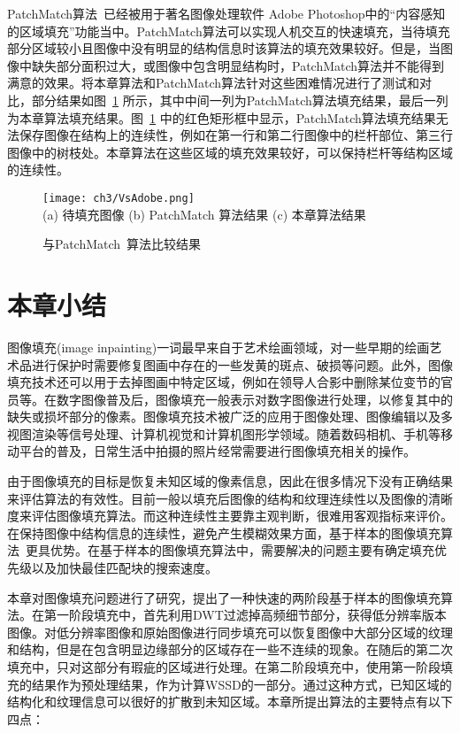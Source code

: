 PatchMatch算法~\cite{Barnes:2009}已经被用于著名图像处理软件 Adobe Photoshop中的``内容感知的区域填充''功能当中。PatchMatch算法可以实现人机交互的快速填充，当待填充部分区域较小且图像中没有明显的结构信息时该算法的填充效果较好。但是，当图像中缺失部分面积过大，或图像中包含明显结构时，PatchMatch算法并不能得到满意的效果。将本章算法和PatchMatch算法针对这些困难情况进行了测试和对比，部分结果如图~\ref{ch3:fig:10} 所示，其中中间一列为PatchMatch算法填充结果，最后一列为本章算法填充结果。图~\ref{ch3:fig:10} 中的红色矩形框中显示，PatchMatch算法填充结果无法保存图像在结构上的连续性，例如在第一行和第二行图像中的栏杆部位、第三行图像中的树枝处。本章算法在这些区域的填充效果较好，可以保持栏杆等结构区域的连续性。
\begin{figure}[!htbp]
\begin{center}
  \texttt{[image: ch3/VsAdobe.png]}
 \\
  (a) 待填充图像 (b) PatchMatch 算法\cite{Barnes:2009}结果    (c) 本章算法结果
\end{center}
\caption{与PatchMatch~\cite{Barnes:2009}算法比较结果}
\label{ch3:fig:10}       %
\end{figure}\par

 \section{本章小结}
 \label{cha3:conclusions}
图像填充(image inpainting)一词最早来自于艺术绘画领域，对一些早期的绘画艺术品进行保护时需要修复图画中存在的一些发黄的斑点、破损等问题。此外，图像填充技术还可以用于去掉图画中特定区域，例如在领导人合影中删除某位变节的官员等。在数字图像普及后，图像填充一般表示对数字图像进行处理，以修复其中的缺失或损坏部分的像素。图像填充技术被广泛的应用于图像处理、图像编辑以及多视图渲染等信号处理、计算机视觉和计算机图形学领域。随着数码相机、手机等移动平台的普及，日常生活中拍摄的照片经常需要进行图像填充相关的操作。\par
由于图像填充的目标是恢复未知区域的像素信息，因此在很多情况下没有正确结果来评估算法的有效性。目前一般以填充后图像的结构和纹理连续性以及图像的清晰度来评估图像填充算法。而这种连续性主要靠主观判断，很难用客观指标来评价。在保持图像中结构信息的连续性，避免产生模糊效果方面，基于样本的图像填充算法~\cite{Criminisi04regionfilling,Xu:2010}更具优势。在基于样本的图像填充算法中，需要解决的问题主要有确定填充优先级以及加快最佳匹配块的搜索速度。\par
本章对图像填充问题进行了研究，提出了一种快速的两阶段基于样本的图像填充算法。在第一阶段填充中，首先利用DWT过滤掉高频细节部分，获得低分辨率版本图像。对低分辨率图像和原始图像进行同步填充可以恢复图像中大部分区域的纹理和结构，但是在包含明显边缘部分的区域存在一些不连续的现象。在随后的第二次填充中，只对这部分有瑕疵的区域进行处理。在第二阶段填充中，使用第一阶段填充的结果作为预处理结果，作为计算WSSD的一部分。通过这种方式，已知区域的结构化和纹理信息可以很好的扩散到未知区域。本章所提出算法的主要特点有以下四点：

